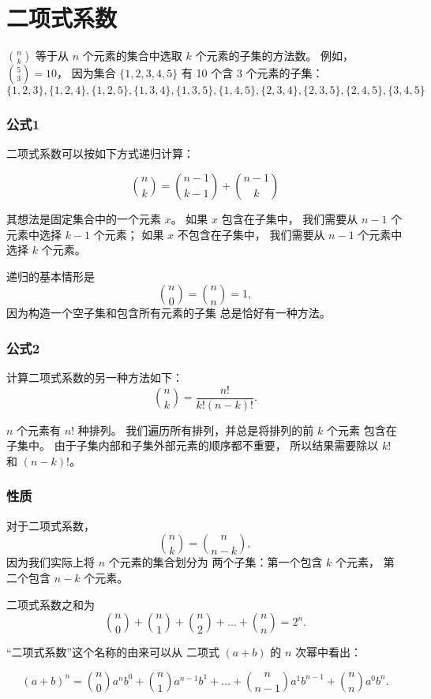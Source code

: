 \section{二项式系数}


 ${n \choose k}$
等于从 $n$ 个元素的集合中选取 $k$ 个元素的子集的方法数。
例如，${5 \choose 3}=10$，
因为集合 $\{1,2,3,4,5\}$
有 10 个含 3 个元素的子集：
\[ \{1,2,3\}, \{1,2,4\}, \{1,2,5\}, \{1,3,4\}, \{1,3,5\}, 
\{1,4,5\}, \{2,3,4\}, \{2,3,5\}, \{2,4,5\}, \{3,4,5\} \]

\subsubsection{公式1}

二项式系数可以按如下方式递归计算：

\[
{n \choose k}  =  {n-1 \choose k-1} + {n-1 \choose k}
\]

其想法是固定集合中的一个元素 $x$。
如果 $x$ 包含在子集中，
我们需要从 $n-1$ 个元素中选择 $k-1$ 个元素；
如果 $x$ 不包含在子集中，
我们需要从 $n-1$ 个元素中选择 $k$ 个元素。

递归的基本情形是
\[
{n \choose 0}  =  {n \choose n} = 1,
\]
因为构造一个空子集和包含所有元素的子集
总是恰好有一种方法。

\subsubsection{公式2}

计算二项式系数的另一种方法如下：
\[
{n \choose k}  =  \frac{n!}{k!(n-k)!}.
\]

$n$ 个元素有 $n!$ 种排列。
我们遍历所有排列，并总是将排列的前 $k$ 个元素
包含在子集中。
由于子集内部和子集外部元素的顺序都不重要，
所以结果需要除以 $k!$ 和 $(n-k)!$。

\subsubsection{性质}

对于二项式系数，
\[
{n \choose k}  =  {n \choose n-k},
\]
因为我们实际上将 $n$ 个元素的集合划分为
两个子集：第一个包含 $k$ 个元素，
第二个包含 $n-k$ 个元素。

二项式系数之和为
\[
{n \choose 0}+{n \choose 1}+{n \choose 2}+\ldots+{n \choose n}=2^n.
\]

“二项式系数”这个名称的由来可以从
二项式 $(a+b)$ 的 $n$ 次幂中看出：

\[ (a+b)^n =
{n \choose 0} a^n b^0 + 
{n \choose 1} a^{n-1} b^1 +
\ldots + 
{n \choose n-1} a^1 b^{n-1} +
{n \choose n} a^0 b^n. \]

